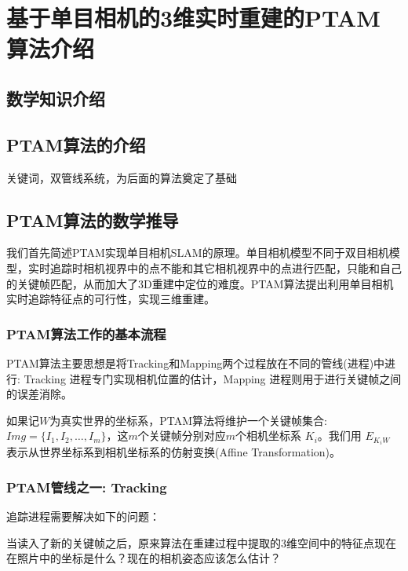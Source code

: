 
\def \R2{\mathbb{R}^2}
\def \R3{\mathbb{R}^3}
\def \Rn{\mathbb{R}^n}

\def \itW{\mathit{W}}

\def \itK{\mathit{K}}
\def \bfp{\mathbf{p}}

\chapter{基于单目相机的3维实时重建的PTAM算法介绍}

\section{数学知识介绍}

\section{PTAM算法的介绍}
关键词，双管线系统，为后面的算法奠定了基础

\section{PTAM算法的数学推导}
我们首先简述PTAM实现单目相机SLAM的原理。单目相机模型不同于双目相机模型，实时追踪时相机视界中的点不能和其它相机视界中的点进行匹配，只能和自己的关键帧匹配，从而加大了3D重建中定位的难度。PTAM算法提出利用单目相机实时追踪特征点的可行性，实现三维重建。

\subsection{PTAM算法工作的基本流程}
PTAM算法主要思想是将Tracking和Mapping两个过程放在不同的管线(进程)中进行: Tracking 进程专门实现相机位置的估计，Mapping 进程则用于进行关键帧之间的误差消除。

如果记$\itW$为真实世界的坐标系，PTAM算法将维护一个关键帧集合: $Img=\{I_1,I_2,\ldots,I_m\}$，这\(m\)个关键帧分别对应\(m\)个相机坐标系 $\itK_i$。我们用 $E_{\itK_i\itW}$ 表示从世界坐标系到相机坐标系的仿射变换(Affine Transformation)。

\subsection{PTAM管线之一: Tracking}

%
%
追踪进程需要解决如下的问题：

当读入了新的关键帧之后，原来算法在重建过程中提取的3维空间中的特征点现在在照片中的坐标是什么？现在的相机姿态应该怎么估计？ 

